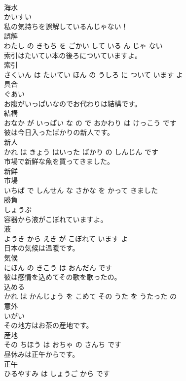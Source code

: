 \documentclass[8pt]{extreport}
\begin{document}
\begin{CJK}{UTF8}{min}
\\	海水	
\\	かいすい		
\\	私の気持ちを誤解しているんじゃない！	
\\	誤解 
\\	わたし の きもち を ごかい して いる ん じゃ ない			
\\	索引はたいてい本の後ろについていますよ。	
\\	索引 
\\	さくいん は たいてい ほん の うしろ に ついて います よ			
\\	具合	
\\	ぐあい		
\\	お腹がいっぱいなのでお代わりは結構です。	
\\	結構 
\\	おなか が いっぱい な の で おかわり は けっこう です			
\\	彼は今日入ったばかりの新人です。	
\\	新人 
\\	かれ は きょう はいった ばかり の しんじん です			
\\	市場で新鮮な魚を買ってきました。	
\\	新鮮 
\\	市場 
\\	いちば で しんせん な さかな を かって きました			
\\	勝負	
\\	しょうぶ		
\\	容器から液がこぼれていますよ。	
\\	液 
\\	ようき から えき が こぼれて います よ			
\\	日本の気候は温暖です。	
\\	気候 
\\	にほん の きこう は おんだん です			
\\	彼は感情を込めてその歌を歌ったの。	
\\	込める 
\\	かれ は かんじょう を こめて その うた を うたった の			
\\	意外	
\\	いがい		
\\	その地方はお茶の産地です。	
\\	産地 
\\	その ちほう は おちゃ の さんち です			
\\	昼休みは正午からです。	
\\	正午 
\\	ひるやすみ は しょうご から です			

\end{CJK}
\end{document}

